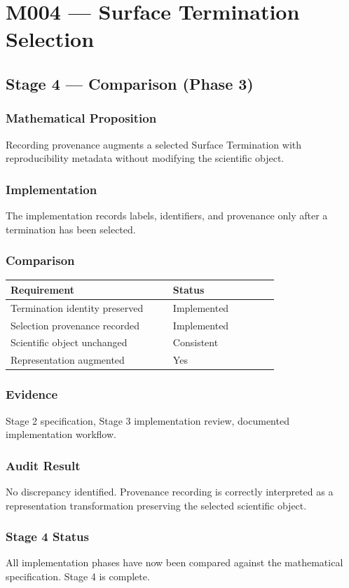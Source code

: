 \chapter{M004 --- Surface Termination Selection}

\section{Stage 4 --- Comparison (Phase 3)}

\subsection{Mathematical Proposition}

Recording provenance augments a selected Surface Termination with
reproducibility metadata without modifying the scientific object.

\subsection{Implementation}

The implementation records labels, identifiers, and provenance only
after a termination has been selected.

\subsection{Comparison}

\begin{center}
\begin{tabular}{|p{0.46\linewidth}|p{0.30\linewidth}|}
\hline
Requirement & Status\\
\hline
Termination identity preserved & Implemented\\
Selection provenance recorded & Implemented\\
Scientific object unchanged & Consistent\\
Representation augmented & Yes\\
\hline
\end{tabular}
\end{center}

\subsection{Evidence}

Stage 2 specification, Stage 3 implementation review, documented
implementation workflow.

\subsection{Audit Result}

No discrepancy identified. Provenance recording is correctly interpreted
as a representation transformation preserving the selected scientific
object.

\subsection{Stage 4 Status}

All implementation phases have now been compared against the
mathematical specification. Stage 4 is complete.
